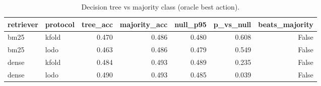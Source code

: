 \begin{table}
\caption{Decision tree vs majority class (oracle best action).}
\label{tab:b-tree}
\begin{tabular}{llrrrrr}
\toprule
retriever & protocol & tree\_acc & majority\_acc & null\_p95 & p\_vs\_null & beats\_majority \\
\midrule
bm25 & kfold & 0.470 & 0.486 & 0.480 & 0.608 & False \\
bm25 & lodo & 0.463 & 0.486 & 0.479 & 0.549 & False \\
dense & kfold & 0.484 & 0.493 & 0.489 & 0.235 & False \\
dense & lodo & 0.490 & 0.493 & 0.485 & 0.039 & False \\
\bottomrule
\end{tabular}
\end{table}
